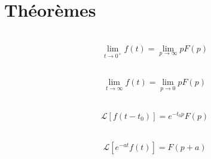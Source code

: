 \section{Théorèmes}
\begin{multicols}{2}
\begin{theorem} ~\\
$$ \lim\limits_{t \to 0^+} f(t) = \lim\limits_{p \to \infty} pF(p)$$
\end{theorem} 

\begin{theorem} ~\\
$$\lim\limits_{t \to \infty} f(t) = \lim\limits_{p \to 0} pF(p)$$
\end{theorem} 

\begin{theorem} ~\\
$$\mathcal{L}\left[ f\left(t-t_0\right) \right] = e^{-t_0 p}F(p)$$
\end{theorem} 

\begin{theorem} ~\\
$$\mathcal{L} \left[ e^{-a t} f\left(t\right) \right] = F(p+a)$$
\end{theorem} 
\end{multicols}


%
%
%


